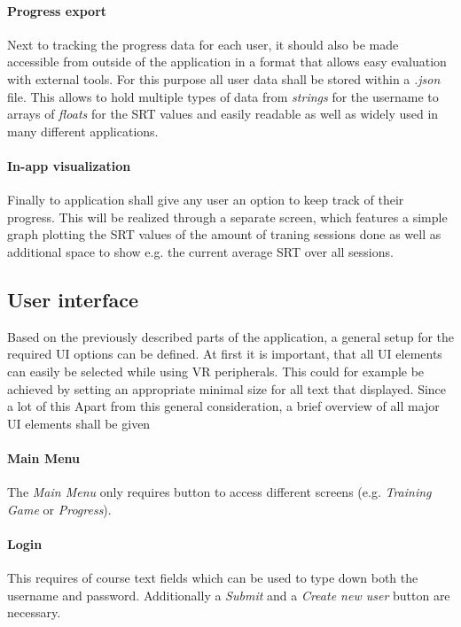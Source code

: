 \documentclass[a4paper,11pt]{article}%
\renewcommand{\\}{\vspace*{0.5\baselineskip} \newline}
\begin{document}
\paragraph{Progress export} Next to tracking the progress data for each user, it should also be made accessible from outside of the application in a format that allows easy evaluation with external tools. For this purpose all user data shall be stored within a \textit{.json} file. This allows to hold multiple types of data from \textit{strings} for the username to arrays of \textit{floats} for the \ac{SRT} values and easily readable as well as widely used in many different applications.


\paragraph{In-app visualization} Finally to application shall give any user an option to keep track of their progress. This will be realized through a separate screen, which features a simple graph plotting the \ac{SRT} values of the amount of traning sessions done as well as additional space to show e.g. the current average \ac{SRT} over all sessions.


\subsection{User interface}
\label{sec:ui-concept}
Based on the previously described parts of the application, a general setup for the required \ac{UI} options can be defined. At first it is important, that all \ac{UI} elements can easily be selected while using \ac{VR} peripherals. This could for example be achieved by setting an appropriate minimal size for all text that displayed. Since a lot of this 
\newline
\newline
Apart from this general consideration, a brief overview of all major \ac{UI} elements shall be given


\paragraph{Main Menu} The \textit{Main Menu} only requires button to access different screens (e.g. \textit{Training Game} or \textit{Progress}).

\paragraph{Login} This requires of course text fields which can be used to type down both the username and password. Additionally a \textit{Submit} and a \textit{Create new user} button are necessary.
\end{document}

